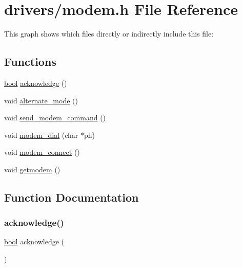 \hypertarget{a00047}{}\section{drivers/modem.h File Reference}
\label{a00047}
This graph shows which files directly or indirectly include this file\+:
\subsection*{Functions}
\begin{DoxyCompactItemize}
\item 
\hyperlink{a00140_af6a258d8f3ee5206d682d799316314b1_af6a258d8f3ee5206d682d799316314b1}{bool} \hyperlink{a00047_a8529dba543149138317e327931bf5a5c_a8529dba543149138317e327931bf5a5c}{acknowledge} ()
\item 
void \hyperlink{a00047_ace378eaa88c0b7f0cdafe97d064e36fb_ace378eaa88c0b7f0cdafe97d064e36fb}{alternate\+\_\+mode} ()
\item 
void \hyperlink{a00047_adf147e13a3c0b23148f4eb1db184f68d_adf147e13a3c0b23148f4eb1db184f68d}{send\+\_\+modem\+\_\+command} ()
\item 
void \hyperlink{a00047_ab1123a026be8f7d0ece72e2813222da0_ab1123a026be8f7d0ece72e2813222da0}{modem\+\_\+dial} (char $\ast$ph)
\item 
void \hyperlink{a00047_a283a7e4b715971478687b2d7547780cb_a283a7e4b715971478687b2d7547780cb}{modem\+\_\+connect} ()
\item 
void \hyperlink{a00047_a5e56e19ccc8f36690d515dd09948db10_a5e56e19ccc8f36690d515dd09948db10}{getmodem} ()
\end{DoxyCompactItemize}


\subsection{Function Documentation}
\mbox{\label{a00047_a8529dba543149138317e327931bf5a5c_a8529dba543149138317e327931bf5a5c}} 
\subsubsection{\texorpdfstring{acknowledge()}{acknowledge()}}
{\footnotesize\ttfamily \hyperlink{a00140_af6a258d8f3ee5206d682d799316314b1_af6a258d8f3ee5206d682d799316314b1}{bool} acknowledge (\begin{DoxyParamCaption}{ }\end{DoxyParamCaption})}



